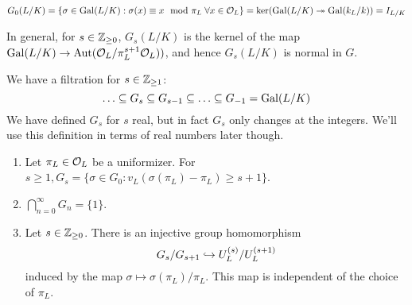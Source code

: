 \documentclass[10pt,a4paper]{article}
\begin{document}
\mbox{$G_0(L/K) = \{\sigma\in\Gal(L/K):\sigma(x)\equiv x \mod \pi_L \forall x \in \O_L\} = \ker(\Gal(L/K)\surjection \Gal(k_L/k)) = I_{L/K}$}

In general, for $s \in \mathbb{Z}_{\geq 0}$, $G_s(L/K)$ is the kernel of the map $\operatorname{Gal}(L/K) \to \operatorname{Aut}(\mathcal{O}_L/\pi_L^{s+1}\mathcal{O}_L))$, and hence $G_s(L/K)$ is normal in $G$.

We have a filtration for $s \in \mathbb{Z}_{\geq 1}$:
\[\ldots \subseteq G_s \subseteq G_{s-1}\subseteq \ldots \subseteq G_{-1} = \operatorname{Gal}(L/K)\]
We have defined $G_s$ for $s$ real, but in fact $G_s$ only changes at the integers. We'll use this definition in terms of real numbers later though.

\begin{theorem}\hspace*{0cm}
  \begin{enumerate}
    \item Let $\pi_L \in \mathcal{O}_L$ be a uniformizer.
    For $s \geq 1, G_s = \{\sigma \in G_0:v_L(\sigma(\pi_L)-\pi_L)\geq s+1\}$.
    \item $\bigcap_{n=0}^\infty G_n = \{1\}$.
    \item Let $s \in \mathbb{Z}_{\geq 0}$. There is an injective group homomorphism
    \[G_s/G_{s+1} \hookrightarrow U_L^{(s)}/U_L^{(s+1)}\]
    induced by the map $\sigma\mapsto \sigma(\pi_L)/\pi_L$. This map is independent of the choice of $\pi_L$.
  \end{enumerate}
\end{theorem}
\end{document}
